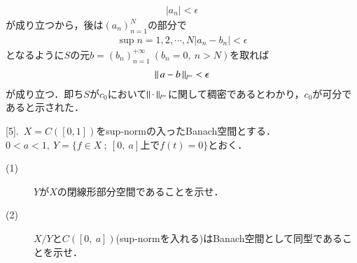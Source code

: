 \begin{prf}
\begin{description}
		\begin{align}
			|a_n| < \epsilon
		\end{align}
		が成り立つから，後は$(a_n)_{n=1}^{N}$の部分で
		\begin{align}
			\sup{n=1,2,\cdots,N}{|a_n - b_n|} < \epsilon
		\end{align}
		となるように$S$の元$b=(b_n)_{n=1}^{+\infty}\ (b_n = 0,\ n>N)$を取れば
		\begin{align}
			\left\|\, a - b\, \right\|_{l^{\infty}} < \epsilon
		\end{align}
		が成り立つ．即ち$S$が$c_0$において$\left\|\, \cdot\, \right\|_{l^{\infty}}$に関して稠密であるとわかり，$c_0$が可分であると示された．
		\QED
\end{description}
\end{prf}

[5].\ $X=C([0,1])$をsup-normの入ったBanach空間とする．$0 < a <1,\ Y=\{f \in X\ ;\ [0,\ a]\mbox{上で}f(t)=0\}$とおく．
\begin{description}
	\item[(1)] $Y$が$X$の閉線形部分空間であることを示せ．
	\item[(2)] $X/Y$と$C([0,\ a])$(sup-normを入れる)はBanach空間として同型であることを示せ．
\end{description}

